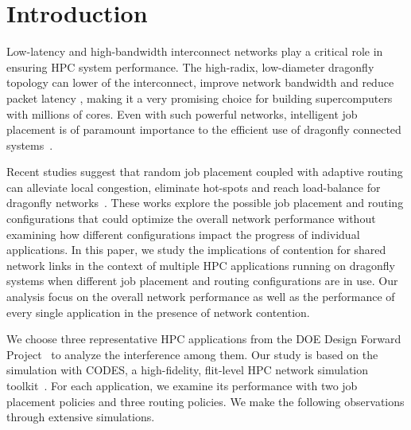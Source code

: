 \section{Introduction}
\label{sec:intro}

Low-latency and high-bandwidth interconnect networks play a critical role in ensuring HPC system performance. 
The high-radix, low-diameter dragonfly topology can lower  of the interconnect, improve network bandwidth and reduce packet latency \cite{dally-dragonfly}, 
making it a very promising choice for building supercomputers with millions of cores.
Even with such powerful networks, 
intelligent job placement is of paramount importance to the efficient use of dragonfly connected systems~\cite{bhatele2015, jain-sc14}. 

Recent studies suggest that random job placement coupled with adaptive routing can alleviate local congestion, eliminate hot-spots and reach load-balance for dragonfly networks~\cite{jain-sc14, bhatele-sc11, brandt2014}. 
These works explore the possible job placement and routing configurations that could optimize the overall network performance without examining how different configurations impact the progress of individual applications.
In this paper, we study the implications of contention for shared network links in the context of multiple HPC applications running on dragonfly systems when different job placement and routing configurations are in use.
Our analysis focus on the overall network performance as well as the performance of every single application in the presence of network contention.



We choose three representative HPC applications from the DOE Design Forward Project~\cite{designforward-webpage} to analyze the interference among them. Our study is based on the simulation with CODES, a high-fidelity, flit-level HPC network simulation toolkit~\cite{codes}.
For each application, we examine its performance with two job placement policies and three routing policies.
We make the following observations through extensive simulations.


